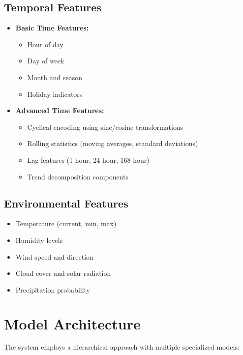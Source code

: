\documentclass[12pt,a4paper]{report}
\begin{document}
\subsection{Temporal Features}
\begin{itemize}
\item \textbf{Basic Time Features:}
  \begin{itemize}
    \item Hour of day
    \item Day of week
    \item Month and season
    \item Holiday indicators
  \end{itemize}

\item \textbf{Advanced Time Features:}
  \begin{itemize}
    \item Cyclical encoding using sine/cosine transformations
    \item Rolling statistics (moving averages, standard deviations)
    \item Lag features (1-hour, 24-hour, 168-hour)
    \item Trend decomposition components
  \end{itemize}
\end{itemize}

\subsection{Environmental Features}
\begin{itemize}
\item Temperature (current, min, max)
\item Humidity levels
\item Wind speed and direction
\item Cloud cover and solar radiation
\item Precipitation probability
\end{itemize}

\section{Model Architecture}
The system employs a hierarchical approach with multiple specialized models:
\end{document}
